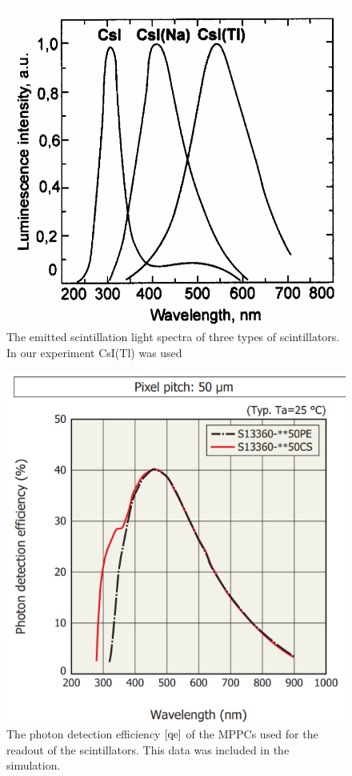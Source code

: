 \documentclass[12pt, a4paper,titlepage]{article}
\numberwithin{equation}{section}
\numberwithin{figure}{section}
\begin{document}
\begin{figure}[H]
\centering
\includegraphics[width=130.0mm]{images/spectracsitl.png}
\caption{The emitted scintillation light spectra of three types of scintillators. In our experiment CsI(Tl) was used}
\end{figure}



\begin{figure}[H]
\centering
\includegraphics[width=130.0mm]{images/qe.png}
\caption{The photon detection efficiency $\cite{qe}$ of the MPPCs used for the readout of the scintillators. This data was included in the simulation.}
\end{figure}
\end{document}

